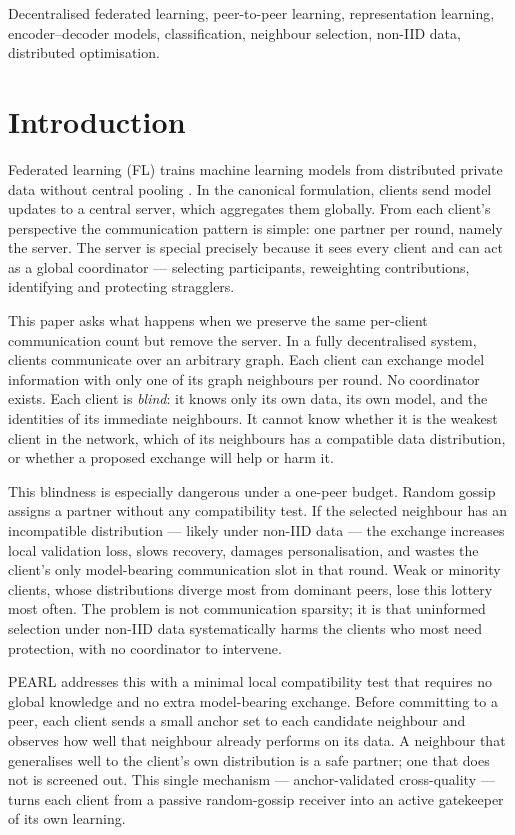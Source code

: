 \documentclass[conference]{IEEEtran}
\begin{document}
\begin{IEEEkeywords}
Decentralised federated learning, peer-to-peer learning, representation learning, encoder--decoder models, classification, neighbour selection, non-IID data, distributed optimisation.
\end{IEEEkeywords}

\section{Introduction}
\label{sec:introduction}
Federated learning (FL) trains machine learning models from distributed private data without central pooling \cite{mcmahan2017communication}. In the canonical formulation, clients send model updates to a central server, which aggregates them globally. From each client's perspective the communication pattern is simple: one partner per round, namely the server. The server is special precisely because it sees every client and can act as a global coordinator --- selecting participants, reweighting contributions, identifying and protecting stragglers.

This paper asks what happens when we preserve the same per-client communication count but remove the server. In a fully decentralised system, clients communicate over an arbitrary graph. Each client can exchange model information with only one of its graph neighbours per round. No coordinator exists. Each client is \emph{blind}: it knows only its own data, its own model, and the identities of its immediate neighbours. It cannot know whether it is the weakest client in the network, which of its neighbours has a compatible data distribution, or whether a proposed exchange will help or harm it.

This blindness is especially dangerous under a one-peer budget. Random gossip assigns a partner without any compatibility test. If the selected neighbour has an incompatible distribution --- likely under non-IID data --- the exchange increases local validation loss, slows recovery, damages personalisation, and wastes the client's only model-bearing communication slot in that round. Weak or minority clients, whose distributions diverge most from dominant peers, lose this lottery most often. The problem is not communication sparsity; it is that uninformed selection under non-IID data systematically harms the clients who most need protection, with no coordinator to intervene.

PEARL addresses this with a minimal local compatibility test that requires no global knowledge and no extra model-bearing exchange. Before committing to a peer, each client sends a small anchor set to each candidate neighbour and observes how well that neighbour already performs on its data. A neighbour that generalises well to the client's own distribution is a safe partner; one that does not is screened out. This single mechanism --- anchor-validated cross-quality --- turns each client from a passive random-gossip receiver into an active gatekeeper of its own learning.
\end{document}

